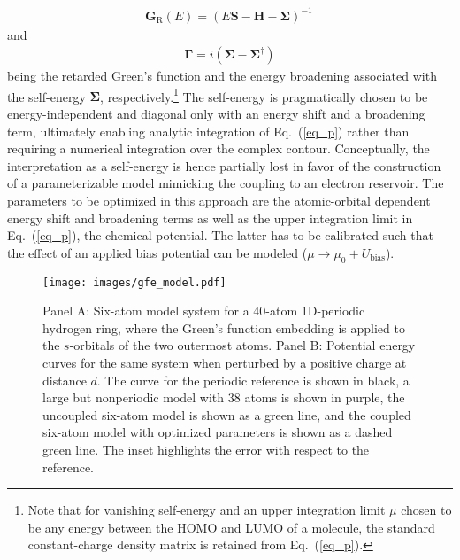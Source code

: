 \documentclass[a4paper,11pt,headings=normal]{scrartcl}
\begin{document}
\begin{itemize}
\begin{align}
\mathbf{G}_\mathrm{R}(E) = \left( E \mathbf{S} - \mathbf{H} -\mathbf{\Sigma} \right)^{-1} \, 
\label{ret_green}
\end{align}
and 
\begin{align}
\mathbf{\Gamma} = i (\mathbf{\Sigma} - \mathbf{\Sigma}^\dagger)
\end{align}
being the retarded Green's function\autocite{kadanoff1962,meir1992} and the 
energy broadening associated with the self-energy $\mathbf{\Sigma}$, 
respectively.\footnote{Note that for vanishing self-energy and an upper 
integration limit $\mu$ chosen to be any energy between the HOMO and LUMO of a 
molecule, the standard constant-charge density matrix is retained from 
Eq.~(\ref{eq_p}).} The self-energy is pragmatically chosen to be 
energy-independent and diagonal only with an energy shift and a 
broadening term,\autocite{arnold2007} ultimately enabling analytic integration 
of Eq.~(\ref{eq_p}) rather than requiring a numerical integration over the 
complex contour\autocite{williams1982}. Conceptually, the interpretation as a 
self-energy is hence partially lost in favor of the construction of a 
parameterizable model mimicking the coupling to an electron reservoir.
The parameters to be optimized in this approach are the 
atomic-orbital dependent energy shift and broadening terms as well as the upper 
integration limit in Eq.~(\ref{eq_p}), the chemical potential. The latter has 
to be calibrated such that the effect of an applied bias potential can be 
modeled ($\mu \rightarrow \mu_0 + U_\text{bias}$).\\
\begin{figure}[h!]
	\centering
	\vspace{-0.5em}
	\texttt{[image: images/gfe\_model.pdf]}
	\vspace{-2.5em}
	\caption{Panel A: Six-atom model system for a 40-atom 1D-periodic hydrogen 
		ring, where the Green's function embedding is applied to the $s$-orbitals of 
		the two outermost atoms. Panel B: Potential energy curves for the same system 
		when perturbed by a positive charge at distance $d$. The curve for the 
		periodic reference is shown in black, a large but nonperiodic model with 38 
		atoms is shown in purple, the uncoupled six-atom model is shown as a green 
		line, and the coupled six-atom model with optimized parameters is shown as a 
		dashed green line. The inset highlights the error with respect to the 
		reference.}  
	\label{fig:pop_gfe}
	\vspace{-1em}
\end{figure}


\end{itemize}
\end{document}
